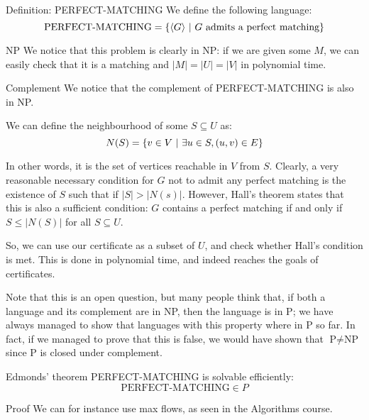 \documentclass[a4paper]{article}
\begin{document}
\begin{parag}{Definition: PERFECT-MATCHING}
    We define the following language: 
    \[\text{PERFECT-MATCHING} = \left\{\left\langle G \right\rangle \suchthat G \text{ admits a perfect matching} \right\}\]
    
    \begin{subparag}{NP}
        We notice that this problem is clearly in NP: if we are given some $M$, we can easily check that it is a matching and $\left|M\right| = \left|U\right| = \left|V\right|$ in polynomial time.
    \end{subparag}

    \begin{subparag}{Complement}
        We notice that the complement of PERFECT-MATCHING is also in NP. 

        We can define the neighbourhood of some $S \subseteq U$ as: 
        \[N\left(S\right) = \left\{v \in V \suchthat \exists u \in S, \left(u, v\right) \in E\right\}\]
        
        In other words, it is the set of vertices reachable in $V$ from $S$. Clearly, a very reasonable necessary condition for $G$ not to admit any perfect matching is the existence of $S$ such that if $\left|S\right| > \left|N\left(s\right)\right|$. However, Hall's theorem states that this is also a sufficient condition: $G$ contains a perfect matching if and only if $S \leq \left|N\left(S\right)\right|$ for all $S \subseteq U$.

        So, we can use our certificate as a subset of $U$, and check whether Hall's condition is met. This is done in polynomial time, and indeed reaches the goals of certificates.

        Note that this is an open question, but many people think that, if both a language and its complement are in NP, then the language is in P; we have always managed to show that languages with this property where in P so far. In fact, if we managed to prove that this is false, we would have shown that $\text{P} \neq \text{NP}$ since P is closed under complement.
    \end{subparag}
\end{parag}

\begin{parag}{Edmonds' theorem}
    PERFECT-MATCHING is solvable efficiently: 
    \[\text{PERFECT-MATCHING} \in P\]

    \begin{subparag}{Proof}
        We can for instance use max flows, as seen in the Algorithms course.
    \end{subparag}
\end{parag}
\end{document}
